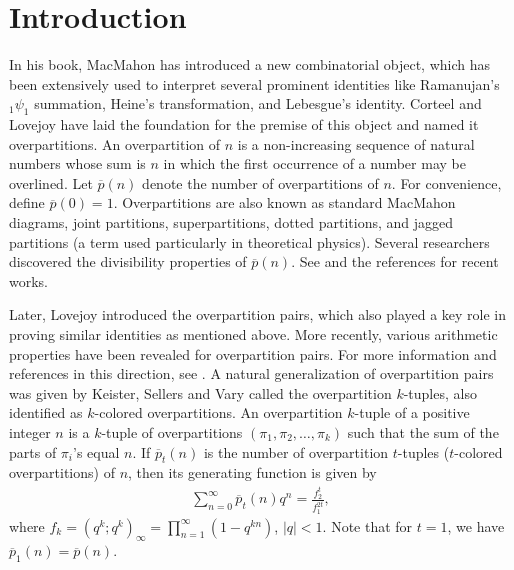 \documentclass[12pt,reqno,a4paper]{amsart}
\numberwithin{equation}{section}
\begin{document}
\section{Introduction}
In his book, MacMahon \cite{mac} has introduced a new combinatorial object, which has been extensively used to interpret several prominent identities like Ramanujan’s $_1\psi_1$ summation, Heine’s transformation, and Lebesgue’s identity.
Corteel and Lovejoy \cite{corteel} have laid the foundation for the premise of this object and named it overpartitions.
An overpartition of $ n$ is a non-increasing sequence of natural numbers whose sum is $n$ in which the first occurrence of a number may be overlined. Let $\overline{p}(n)$
 denote the number of overpartitions of $n$. For convenience, define $\overline{p}(0)=1$. Overpartitions are also known as standard MacMahon diagrams, joint partitions, superpartitions, dotted partitions, and jagged partitions (a term used particularly in theoretical physics).  
Several researchers discovered the divisibility properties of $\overline{p}(n)$. See \cite{dasappa2024further, liang2025school} and the references for recent works. 

 
 Later, Lovejoy \cite{lovejoy} introduced the overpartition pairs, which also played a key role in proving similar identities as mentioned above. More recently, various arithmetic properties have been revealed for overpartition pairs. For more information and references in this direction, see \cite{bring, chen, kim}.
A natural generalization of overpartition pairs was given by Keister, Sellers and Vary \cite{keister} called the overpartition $k$-tuples, also identified as $k$-colored overpartitions. An overpartition $k$-tuple
of a positive integer $n$ is a $k$-tuple of overpartitions $(\pi_1,\pi_2,\ldots,\pi_k)$ such that the sum of the parts of $\pi_i$'s equal $n$. If $\overline{p}_{t}(n)$ is the number of overpartition $t$-tuples ($t$-colored overpartitions) of $n$, then its generating function is given by
\begin{align}\label{tt}
    \sum_{n=0}^{\infty}\overline{p}_{t}(n)q^n=\frac{f_2^t}{f_1^{2t}},
\end{align}
where $f_k=(q^k;q^k)_\infty=\displaystyle\prod_{n=1}^{\infty}(1-q^{kn})$, $|q|<1$.
Note that for $t=1$, we have $\overline{p}_{1}(n)=\overline{p}(n)$. \\
\end{document}
